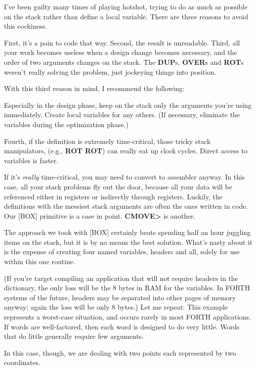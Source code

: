 I've been guilty many times of playing hotshot, trying to do as
much as possible on the stack rather than define a local variable. There
are three reasons to avoid this cockiness.

First, it's a pain to code that way. Second, the result is unreadable.
Third, all your work becomes useless when a design change becomes
necessary, and the order of two arguments changes on the stack. The
\textbf{DUP}s, \textbf{OVER}s and \textbf{ROT}s weren't really solving the problem,
just jockeying things into position.

With this third reason in mind, I recommend the following:

\begin{tip}
Especially in the design phase, keep on the stack only the arguments you're
using immediately. Create local variables for any others. (If necessary,
eliminate the variables during the optimization phase.)
\end{tip}
Fourth, if the definition is extremely time-critical, those tricky stack
manipulators, (e.g., \textbf{ROT ROT}) can really eat up clock cycles. Direct
access to variables is faster.

If it's \emph{really} time-critical, you may need to convert to assembler
anyway. In this case, all your stack problems fly out the door, because all
your data will be referenced either in registers or indirectly through
registers. Luckily, the definitions with the messiest stack arguments are
often the ones written in code. Our [BOX] primitive is a case in point.
\textbf{CMOVE>} is another.

The approach we took with [BOX] certainly beats spending half an
hour juggling items on the stack, but it is by no means the best solution.
What's nasty about it is the expense of creating four named variables,
headers and all, solely for use within this one routine.

(If you're target compiling an application that will not require
headers in the dictionary, the only loss will be the 8 bytes in RAM for the
variables. In FORTH systems of the future, headers may be separated
into other pages of memory anyway; again the loss will be only 8 bytes.)
Let me repeat: This example represents a worst-case situation, and
occurs rarely in most FORTH applications. If words are well-factored,
then each word is designed to do very little. Words that do little generally
require few arguments.

In this case, though, we are dealing with two points each represented
by two coordinates.

